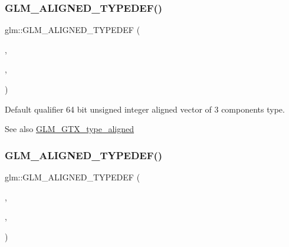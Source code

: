 \subsubsection{\texorpdfstring{G\+L\+M\+\_\+\+A\+L\+I\+G\+N\+E\+D\+\_\+\+T\+Y\+P\+E\+D\+E\+F()}{GLM\_ALIGNED\_TYPEDEF()}\hspace{0.1cm}{\footnotesize\ttfamily [135/209]}}
{\footnotesize\ttfamily glm\+::\+G\+L\+M\+\_\+\+A\+L\+I\+G\+N\+E\+D\+\_\+\+T\+Y\+P\+E\+D\+EF (\begin{DoxyParamCaption}\item[{\mbox{\hyperlink{group__gtc__type__precision_ga2d3e22f2413f79536d5cf3561949cd53}{u64vec3}}}]{,  }\item[{aligned\+\_\+u64vec3}]{,  }\item[{32}]{ }\end{DoxyParamCaption})}

Default qualifier 64 bit unsigned integer aligned vector of 3 components type. \begin{DoxySeeAlso}{See also}
\mbox{\hyperlink{group__gtx__type__aligned}{G\+L\+M\+\_\+\+G\+T\+X\+\_\+type\+\_\+aligned}} 
\end{DoxySeeAlso}
\mbox{\label{group__gtx__type__aligned_ga53a8a03dca2015baec4584f45b8e9cdc}} 
\subsubsection{\texorpdfstring{G\+L\+M\+\_\+\+A\+L\+I\+G\+N\+E\+D\+\_\+\+T\+Y\+P\+E\+D\+E\+F()}{GLM\_ALIGNED\_TYPEDEF()}\hspace{0.1cm}{\footnotesize\ttfamily [136/209]}}
{\footnotesize\ttfamily glm\+::\+G\+L\+M\+\_\+\+A\+L\+I\+G\+N\+E\+D\+\_\+\+T\+Y\+P\+E\+D\+EF (\begin{DoxyParamCaption}\item[{\mbox{\hyperlink{group__gtc__type__precision_ga70396c4f422824503c870db50b3059fd}{u64vec4}}}]{,  }\item[{aligned\+\_\+u64vec4}]{,  }\item[{32}]{ }\end{DoxyParamCaption})}

